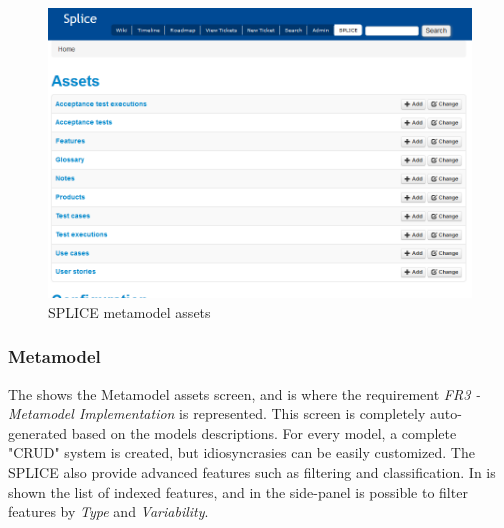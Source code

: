 \begin{figure}[htp]
\begin{center}
  \includegraphics[width=14cm]{chapters/proposed_solution/img/captures/asserts.PNG}
  \caption[SPLICE metamodel assets]{SPLICE metamodel assets}
  \label{fg:splice-metamodel-assets}
\end{center}
\end{figure}

\subsubsection{Metamodel}


The  shows the Metamodel assets screen, and is where the requirement\textit{ FR3 - Metamodel Implementation} is represented. This screen is completely auto-generated based on the models descriptions. For every model, a complete "\acf{CRUD}" system is created, but idiosyncrasies can be easily customized. The \ac{SPLICE} also provide advanced features such as filtering and classification. In  is shown the list of indexed features, and in the side-panel is possible to filter features by \textit{Type} and \textit{Variability}.

